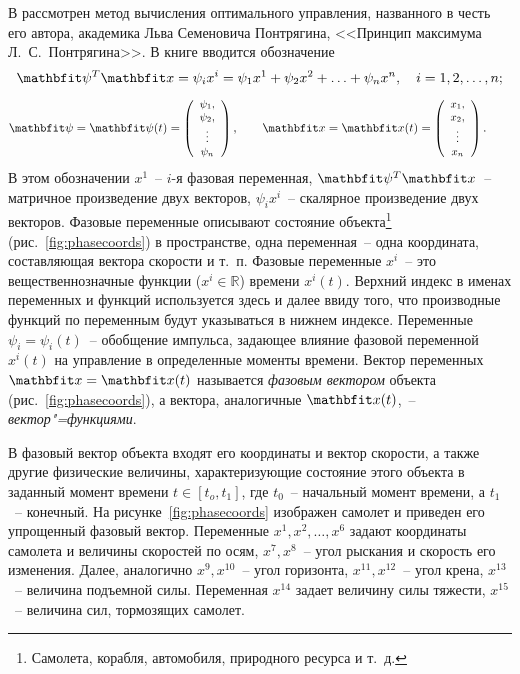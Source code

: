 \documentclass[a4paper,14pt, openany, twoside, final]{extbook} %
\begin{document}
В \cite{pontr} рассмотрен метод вычисления оптимального управления, названного в честь его автора, академика Льва Семеновича Понтрягина, <<Принцип максимума Л.~С.~Понтрягина>>.  В книге вводится обозначение
$$
\vecpsi^T\vecx=\psi_ix^i=\psi_1x^1+\psi_2x^2+\ldots +\psi_nx^n,\quad i=1,2,\ldots,n;
$$
$$
\vecpsi=\vecpsi(t)=\left({\small
  \begin{array}{c}
    \psi_1,\\ \psi_2,\\ \vdots\\ \psi_n
  \end{array}}
\right),\qquad\vecx=\vecx(t)=\left({\small
  \begin{array}{c}
    x_1,\\ x_2,\\ \vdots\\ x_n
  \end{array}}
\right).\qquad
$$
В этом обозначении $x^1$~-- $i$-я фазовая переменная, $\vecpsi^T\vecx$~-- матричное произведение двух векторов, $\psi_ix^i$~-- скалярное произведение двух векторов.  Фазовые переменные описывают состояние объекта\footnote{Самолета, корабля, автомобиля, природного ресурса и т.~д.} (рис.~\ref{fig:phasecoords}) в пространстве, одна переменная~-- одна координата, составляющая вектора скорости и т.~п.  Фазовые переменные $x^i$~-- это вещественнозначные функции ($x^i\in\mathbb{R}$) времени $x^i(t)$.  Верхний индекс в именах переменных и функций используется здесь и далее ввиду того, что производные функций по переменным будут указываться в нижнем индексе.  Переменные $\psi_i=\psi_i(t)$~-- обобщение импульса, задающее влияние фазовой переменной $x^i(t)$ на управление в определенные моменты времени.  Вектор переменных $\vecx=\vecx(t)$ называется \emph{фазовым вектором} объекта (рис.~\ref{fig:phasecoords}), а вектора, аналогичные $\vecx(t)$,~-- \emph{вектор"=функциями}.

В фазовый вектор объекта входят его координаты и вектор скорости, а также другие физические величины, характеризующие состояние этого объекта в заданный момент времени $t\in[t_o,t_1]$, где $t_0$~-- начальный момент времени, а $t_1$~-- конечный.  На рисунке~\ref{fig:phasecoords} изображен самолет и приведен его упрощенный фазовый вектор.  Переменные $x^1,x^2,\ldots,x^6$ задают координаты самолета и величины скоростей по осям, $x^7,x^8$~-- угол рыскания и скорость его изменения.  Далее, аналогично $x^9,x^{10}$~-- угол горизонта, $x^{11},x^{12}$~-- угол крена, $x^{13}$~-- величина подъемной силы.  Переменная $x^{14}$ задает величину силы тяжести, $x^{15}$~-- величина сил, тормозящих самолет.
\end{document}
